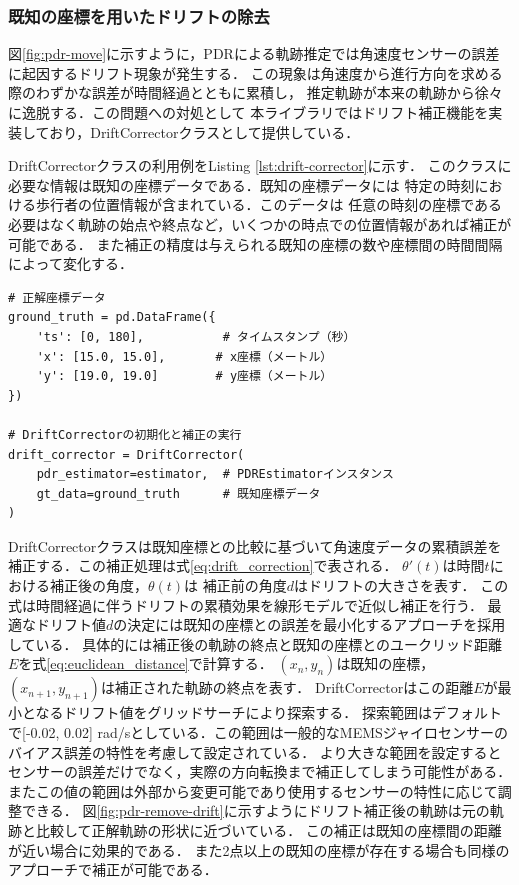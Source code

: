 \subsubsection{既知の座標を用いたドリフトの除去}


図\ref{fig:pdr-move}に示すように，PDRによる軌跡推定では角速度センサーの誤差に起因するドリフト現象が発生する．
この現象は角速度から進行方向を求める際のわずかな誤差が時間経過とともに累積し，
推定軌跡が本来の軌跡から徐々に逸脱する．この問題への対処として
本ライブラリではドリフト補正機能を実装しており，DriftCorrectorクラスとして提供している．


DriftCorrectorクラスの利用例をListing \ref{lst:drift-corrector}に示す．
このクラスに必要な情報は既知の座標データである．既知の座標データには
特定の時刻における歩行者の位置情報が含まれている．このデータは
任意の時刻の座標である必要はなく軌跡の始点や終点など，いくつかの時点での位置情報があれば補正が可能である．
また補正の精度は与えられる既知の座標の数や座標間の時間間隔によって変化する．


\begin{lstlisting}[caption={DriftCorrectorの使用例},label=lst:drift-corrector,float=h]
# 正解座標データ
ground_truth = pd.DataFrame({
    'ts': [0, 180],           # タイムスタンプ（秒）
    'x': [15.0, 15.0],       # x座標（メートル）
    'y': [19.0, 19.0]        # y座標（メートル）
})

# DriftCorrectorの初期化と補正の実行
drift_corrector = DriftCorrector(
    pdr_estimator=estimator,  # PDREstimatorインスタンス
    gt_data=ground_truth      # 既知座標データ
)
\end{lstlisting}

DriftCorrectorクラスは既知座標との比較に基づいて角速度データの累積誤差を
補正する．この補正処理は式\eqref{eq:drift_correction}で表される．
$\theta'(t)$は時間$t$における補正後の角度，$\theta(t)$は
補正前の角度$d$はドリフトの大きさを表す．
この式は時間経過に伴うドリフトの累積効果を線形モデルで近似し補正を行う．
最適なドリフト値$d$の決定には既知の座標との誤差を最小化するアプローチを採用している．
具体的には補正後の軌跡の終点と既知の座標とのユークリッド距離$E$を式\eqref{eq:euclidean_distance}で計算する．
$(x_n, y_n)$は既知の座標，$(x_{n+1}, y_{n+1})$は補正された軌跡の終点を表す．
DriftCorrectorはこの距離$E$が最小となるドリフト値をグリッドサーチにより探索する．
探索範囲はデフォルトで[-0.02, 0.02] rad/sとしている．この範囲は一般的なMEMSジャイロセンサーの
バイアス誤差の特性を考慮して設定されている．
より大きな範囲を設定するとセンサーの誤差だけでなく，実際の方向転換まで補正してしまう可能性がある．
またこの値の範囲は外部から変更可能であり使用するセンサーの特性に応じて調整できる．
図\ref{fig:pdr-remove-drift}に示すようにドリフト補正後の軌跡は元の軌跡と比較して正解軌跡の形状に近づいている．
この補正は既知の座標間の距離が近い場合に効果的である．
また2点以上の既知の座標が存在する場合も同様のアプローチで補正が可能である．

